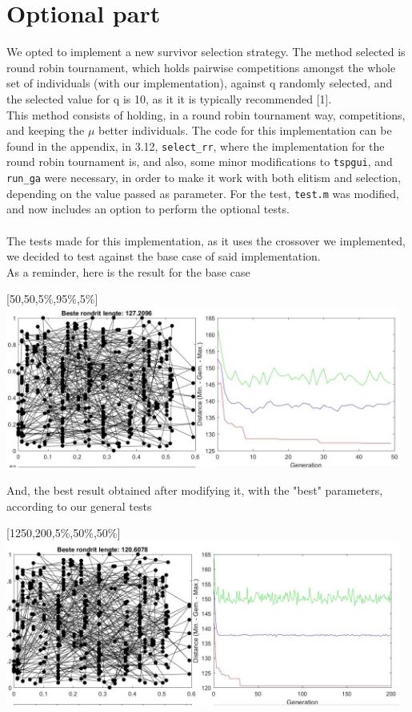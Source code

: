 \section{Optional part}

We opted to implement a new survivor selection strategy. The method selected
is round robin tournament, which holds pairwise competitions amongst the
whole set of individuals (with our implementation), against q randomly
selected, and the selected value for q is 10, as it it is typically
recommended [1].\\ 
This method consists of holding, in a round robin tournament way,
competitions, and keeping the $\mu$ better individuals.
The code for this implementation can be found in the appendix, in 3.12,
\texttt{select\_rr}, where the implementation for the round robin tournament is, and
also, some minor modifications to \texttt{tspgui}, and \texttt{run\_ga} were necessary, in
order to make it work with both elitism and selection, depending on the value
passed as parameter. For the test, \texttt{test.m} was modified, and now includes
an option to perform the optional tests.\\
\\
The tests made for this implementation, as it uses the crossover we
implemented, we decided to test against the base case of said
implementation. \\
As a reminder, here is the result for the base case\\

\begin{center}
[50,50,5\%,95\%,5\%]\\
\includegraphics[width=13cm]{img/specific/order_crossover/general_1.jpg}
\end{center}

And, the best result obtained after modifying it, with the "best"
parameters, according to our general tests\\

\begin{center}
[1250,200,5\%,50\%,50\%]\\
\includegraphics[width=13cm]{img/specific/order_crossover/general_8.jpg}
\end{center}


